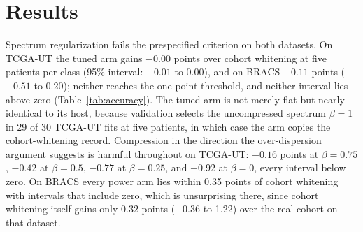 \section{Results}
\label{sec:results}
Spectrum regularization fails the prespecified criterion on both datasets. On TCGA-UT the tuned arm gains $-0.00$ points over cohort whitening at five patients per class (95\% interval: $-0.01$ to 0.00), and on BRACS $-0.11$ points ($-0.51$ to 0.20); neither reaches the one-point threshold, and neither interval lies above zero (Table~\ref{tab:accuracy}). The tuned arm is not merely flat but nearly identical to its host, because validation selects the uncompressed spectrum $\beta=1$ in 29 of 30 TCGA-UT fits at five patients, in which case the arm copies the cohort-whitening record. Compression in the direction the over-dispersion argument suggests is harmful throughout on TCGA-UT: $-0.16$ points at $\beta=0.75$, $-0.42$ at $\beta=0.5$, $-0.77$ at $\beta=0.25$, and $-0.92$ at $\beta=0$, every interval below zero. On BRACS every power arm lies within 0.35 points of cohort whitening with intervals that include zero, which is unsurprising there, since cohort whitening itself gains only 0.32 points ($-0.36$ to 1.22) over the real cohort on that dataset.

